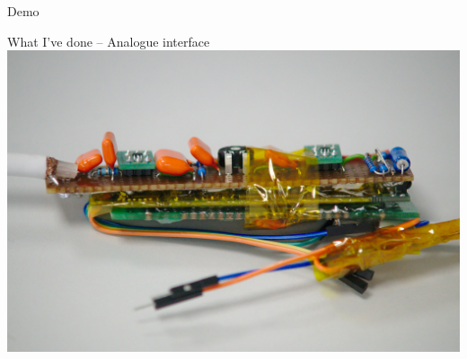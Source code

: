 \documentclass[aspectratio=169,11pt, xcolor={table}]{beamer}
\begin{document}
\begin{frame}[standout]
	Demo
\end{frame}

\begin{frame}{What I've done -- Analogue interface}
\centering
\includegraphics[height=0.8\textheight]{figs/analogue}
\end{frame}
\end{document}
